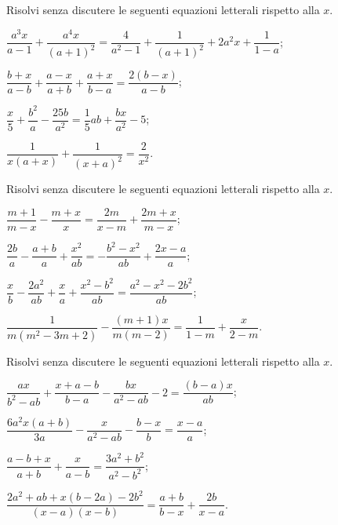 \begin{esercizio}[\Ast]
\label{ese:19.23}
Risolvi senza discutere le seguenti equazioni letterali rispetto alla $x$.
\begin{enumeratea}
 \item $\dfrac{a^{3}x}{a-1}+\dfrac{a^{4}x}{(a+1)^{2}}=\dfrac{4}{a^{2}-1}+\dfrac{1}{(a+1)^{2}}+2a^{2}x+\dfrac{1}{1-a}$;
 \item $\dfrac{b+x}{a-b}+\dfrac{a-x}{a+b}+\dfrac{a+x}{b-a}=\dfrac{2(b-x)}{a-b}$;
 \item $\dfrac{x}{5}+\dfrac{b^{2}}{a}-\dfrac{25b}{a^{2}}=\dfrac{1}{5}ab+\dfrac{bx}{a^{2}}-5$;
 \item $\dfrac{1}{x(a+x)}+\dfrac{1}{(x+a)^{2}}=\dfrac{2}{x^{2}}$.
\end{enumeratea}
\end{esercizio}

\begin{esercizio}[\Ast]
\label{ese:19.24}
Risolvi senza discutere le seguenti equazioni letterali rispetto alla $x$.
\begin{enumeratea}
 \item $\dfrac{m+1}{m-x}-\dfrac{m+x}{x}=\dfrac{2m}{x-m}+\dfrac{2m+x}{m-x}$;
 \item $\dfrac{2b}{a}-\dfrac{a+b}{a}+\dfrac{x^{2}}{ab}=-\dfrac{b^{2}-x^{2}}{ab}+\dfrac{2x-a}{a}$;
 \item $\dfrac{x}{b}-\dfrac{2a^{2}}{ab}+\dfrac{x}{a}+\dfrac{x^{2}-b^{2}}{ab}=\dfrac{a^{2}-x^{2}-2b^{2}}{ab}$;
 \item $\dfrac{1}{m\left(m^{2}-3m+2\right)}-\dfrac{(m+1)x}{m(m-2)}=\dfrac{1}{1-m}+\dfrac{x}{2-m}$.
\end{enumeratea}
\end{esercizio}

\begin{esercizio}[\Ast]
\label{ese:19.25}
Risolvi senza discutere le seguenti equazioni letterali rispetto alla $x$.
\begin{enumeratea}
 \item $\dfrac{ax}{b^{2}-ab}+\dfrac{x+a-b}{b-a}-\dfrac{bx}{a^{2}-ab}-2=\dfrac{(b-a)x}{ab}$;
 \item $\dfrac{6a^{2}x(a+b)}{3a}-\dfrac{x}{a^{2}-ab}-\dfrac{b-x}{b}=\dfrac{x-a}{a}$;
 \item $\dfrac{a-b+x}{a+b}+\dfrac{x}{a-b}=\dfrac{3a^{2}+b^{2}}{a^{2}-b^{2}}$;
 \item $\dfrac{2a^{2}+ab+x(b-2a)-2b^{2}}{(x-a)(x-b)}=\dfrac{a+b}{b-x}+\dfrac{2b}{x-a}$.
\end{enumeratea}
\end{esercizio}
\pagebreak
